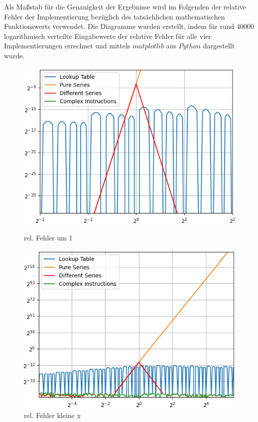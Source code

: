 \documentclass[course=erap] {aspdoc}
\begin{document}
    Als Maßstab für die Genauigkeit der Ergebnisse wird im Folgenden der relative Fehler der Implementierung bezüglich des tatsächlichen mathematischen Funktionswerts verwendet.
    Die Diagramme wurden erstellt, indem für rund 40000 logarithmisch verteilte Eingabewerte der relative Fehler für alle vier Implementierungen errechnet und mittels $matplotlib$ aus $Python$ dargestellt wurde.

    \begin{figure}[htbp]
        \centering
        \begin{minipage}[b]{0.45\textwidth}
            \centering
            \includegraphics[width=\textwidth]{images/Figure1}
            \caption{rel. Fehler um 1}
            \label{fig:abb3}
        \end{minipage}
        \hfill
        \begin{minipage}[b]{0.45\textwidth}
            \centering
            \includegraphics[width=\textwidth]{images/Figure2}
            \caption{rel. Fehler kleine x}
            \label{fig:abb4}
        \end{minipage}
    \end{figure}
    
\end{document}
